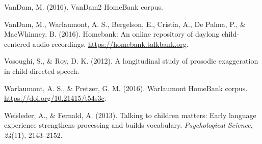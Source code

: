 \documentclass[10pt, letterpaper]{article}
\newenvironment{CSLReferences}%
  {}%
  {\par}
\begin{document}
\begin{CSLReferences}{1}{0}
\leavevmode\hypertarget{ref-vandamcorpus}{}%
VanDam, M. (2016). VanDam2 HomeBank corpus.

\leavevmode\hypertarget{ref-homebank}{}%
VanDam, M., Warlaumont, A. S., Bergelson, E., Cristia, A., De Palma, P.,
\& MacWhinney, B. (2016). Homebank: An online repository of daylong
child-centered audio recordings. \url{https://homebank.talkbank.org}.

\leavevmode\hypertarget{ref-vosoughi2012longitudinal}{}%
Vosoughi, S., \& Roy, D. K. (2012). A longitudinal study of prosodic
exaggeration in child-directed speech.

\leavevmode\hypertarget{ref-warlaumontcorpus}{}%
Warlaumont, A. S., \& Pretzer, G. M. (2016). Warlaumont HomeBank corpus.
\url{https://doi.org/10.21415/t54s3c}.

\leavevmode\hypertarget{ref-weisleder2013talking}{}%
Weisleder, A., \& Fernald, A. (2013). Talking to children matters: Early
language experience strengthens processing and builds vocabulary.
\emph{Psychological Science}, \emph{24}(11), 2143--2152.

\end{CSLReferences}


\end{document}
